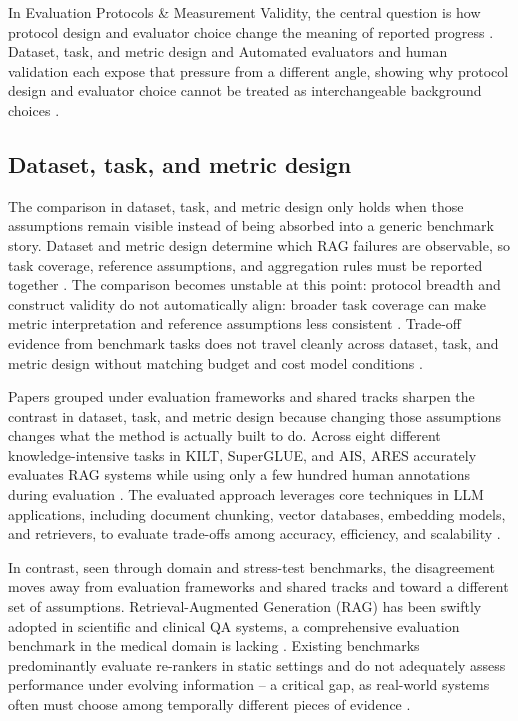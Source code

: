 \documentclass[a4paper,11pt]{article}
\begin{document}
In Evaluation Protocols \& Measurement Validity, the central question is how protocol design and evaluator choice change the meaning of reported progress \citep{Yao2026Authoritybench,An2026Fresco,Li2026Mrag,Upadhyay2026Overview}. Dataset, task, and metric design and Automated evaluators and human validation each expose that pressure from a different angle, showing why protocol design and evaluator choice cannot be treated as interchangeable background choices \citep{Guder2026Rage,SaadFalcon2023Ares,An2026Fresco,Brehme2025Retrieval}.
\subsection{Dataset, task, and metric design}


The comparison in dataset, task, and metric design only holds when those assumptions remain visible instead of being absorbed into a generic benchmark story. Dataset and metric design determine which RAG failures are observable, so task coverage, reference assumptions, and aggregation rules must be reported together \citep{Guder2026Rage,SaadFalcon2023Ares,Yao2026Authoritybench,Li2026Mrag}. The comparison becomes unstable at this point: protocol breadth and construct validity do not automatically align: broader task coverage can make metric interpretation and reference assumptions less consistent \citep{Guder2026Rage,SaadFalcon2023Ares,Yao2026Authoritybench,Li2026Mrag}. Trade-off evidence from benchmark tasks does not travel cleanly across dataset, task, and metric design without matching budget and cost model conditions \citep{Upadhyay2026Overview}.

Papers grouped under evaluation frameworks and shared tracks sharpen the contrast in dataset, task, and metric design because changing those assumptions changes what the method is actually built to do. Across eight different knowledge-intensive tasks in KILT, SuperGLUE, and AIS, ARES accurately evaluates RAG systems while using only a few hundred human annotations during evaluation \citep{SaadFalcon2023Ares}. The evaluated approach leverages core techniques in LLM applications, including document chunking, vector databases, embedding models, and retrievers, to evaluate trade-offs among accuracy, efficiency, and scalability \citep{Guder2026Rage}.

In contrast, seen through domain and stress-test benchmarks, the disagreement moves away from evaluation frameworks and shared tracks and toward a different set of assumptions. Retrieval-Augmented Generation (RAG) has been swiftly adopted in scientific and clinical QA systems, a comprehensive evaluation benchmark in the medical domain is lacking \citep{Li2026Mrag}. Existing benchmarks predominantly evaluate re-rankers in static settings and do not adequately assess performance under evolving information -- a critical gap, as real-world systems often must choose among temporally different pieces of evidence \citep{An2026Fresco}.
\end{document}
